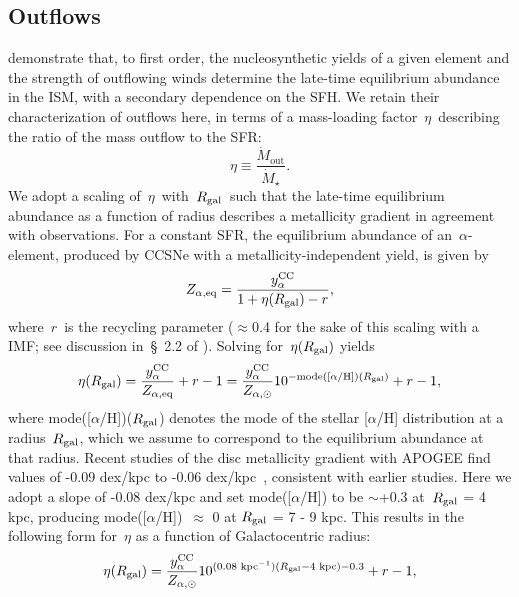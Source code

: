 \documentclass[draft2.tex]{subfiles}
\begin{document}
\subsection{Outflows} 
\label{sec:methods:outflows} 
\citet{Weinberg2017} demonstrate that, to first order, the nucleosynthetic 
yields of a given element and the strength of outflowing winds determine the 
late-time equilibrium abundance in the ISM, with a secondary dependence on the 
SFH. 
We retain their characterization of outflows here, in terms of a mass-loading 
factor~$\eta$~describing the ratio of the mass outflow to the SFR: 
\begin{equation} 
\eta \equiv \frac{\dot{M}_\text{out}}{\dot{M}_\star}. 
\end{equation} 
We adopt a scaling of~$\eta$~with~$R_\text{gal}$~such that the late-time 
equilibrium abundance as a function of radius describes a metallicity 
gradient in agreement with observations. 
For a constant SFR, the equilibrium abundance of an~$\alpha$-element, produced 
by CCSNe with a metallicity-independent yield, is given by 
\begin{equation} 
Z_{\alpha,\text{eq}} = \frac{y_\alpha^\text{CC}}{1 + \eta(R_\text{gal}) - r}, 
\end{equation} 
where~$r$~is the recycling parameter ($\approx$0.4 for the sake of this scaling 
with a~\citealp{Kroupa2001} IMF; see discussion in~\S~2.2 
of \citealp{Weinberg2017}). Solving for~$\eta(R_\text{gal})$ yields 
\begin{equation} 
\eta(R_\text{gal}) = \frac{y_\alpha^\text{CC}}{Z_{\alpha,\text{eq}}} + r - 1 = 
\frac{y_\alpha^\text{CC}}{Z_{\alpha,\odot}}10^{-\text{mode([$\alpha$/H])}
(R_\text{gal})} + r - 1, 
\end{equation} 
where mode([$\alpha$/H])($R_\text{gal}$) denotes the mode of the stellar 
[$\alpha$/H] distribution at a radius~$R_\text{gal}$, which we assume to correspond 
to the equilibrium abundance at that radius. 
Recent studies of the disc metallicity gradient with APOGEE find values of 
-0.09 dex/kpc to -0.06 dex/kpc~\citep[e.g.][]{Frinchaboy2013, Hayden2014, 
Weinberg2019}, consistent with earlier studies. 
Here we adopt a slope of -0.08 dex/kpc and set mode([$\alpha$/H]) to be 
$\sim$+0.3 at~$R_\text{gal}$ = 4 kpc, producing mode([$\alpha$/H])~$\approx$ 0 at 
$R_\text{gal}$ = 7 - 9 kpc. This results in the following form for~$\eta$ as a 
function of Galactocentric radius: 
\begin{equation} 
\eta(R_\text{gal}) = \frac{y_\alpha^\text{CC}}{Z_{\alpha,\odot}} 
10^{(0.08\text{ kpc}^{-1})(R_\text{gal} - 4\text{ kpc}) - 0.3} + r - 1, 
\label{eq:eta_rgal} 
\end{equation} 
\end{document}
